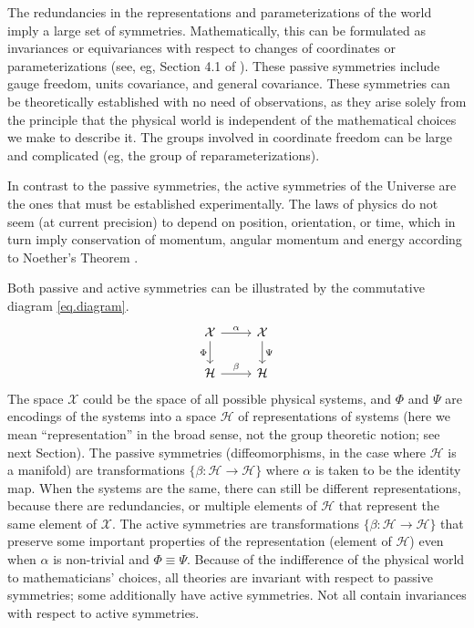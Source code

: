 \documentclass[11pt]{article}
\begin{document}
The redundancies in the representations and parameterizations of the world imply a large set of symmetries.
Mathematically, this can be formulated as invariances or equivariances with respect to changes of coordinates or parameterizations (see, eg, Section 4.1 of \cite{rovelli2000loop}).
These passive symmetries include gauge freedom, units covariance, and general covariance.
These symmetries can be theoretically established with no need of observations, as they arise solely from the principle that the physical world is independent of the mathematical choices we make to describe it.
The groups involved in coordinate freedom can be large and complicated (eg, the group of reparameterizations).

In contrast to the passive symmetries, the active symmetries of the Universe are the ones that must be established experimentally.
The laws of physics do not seem (at current precision) to depend on position, orientation, or time, which in turn imply conservation of momentum, angular momentum and energy according to Noether's Theorem \cite{noether}.

Both passive and active symmetries can be illustrated by the commutative diagram \eqref{eq.diagram}. 
\begin{equation}\label{eq.diagram}
\begin{tikzcd}[]
  {\cal X}\arrow[r,"\alpha"] \arrow[d,"\Phi",swap] & {\cal X}  \arrow[d,"\Psi"]\\
{\cal H} \arrow[r,"\beta"]  & {\cal H} 
\end{tikzcd}
\end{equation}
The space $\mathcal X$ could be the space of all possible physical systems, and $\Phi$ and $\Psi$ are encodings of the systems into a space $\mathcal H$ of representations of systems (here we mean ``representation'' in the broad sense, not the group theoretic notion; see next Section).
The passive symmetries (diffeomorphisms, in the case where $\mathcal H$ is a manifold) are transformations $\{\beta:\mathcal H \to \mathcal H\}$ where $\alpha$ is taken to be the identity map.
When the systems are the same, there can still be different representations, because there are redundancies, or multiple elements of $\mathcal H$ that represent the same element of $\mathcal X$.
The active symmetries are transformations $\{\beta:\mathcal H \to \mathcal H\}$ that preserve some important properties of the representation (element of $\mathcal H$) even when $\alpha$ is non-trivial and $\Phi\equiv \Psi$.
Because of the indifference of the physical world to mathematicians' choices, all theories are invariant with respect to passive symmetries; some additionally have active symmetries.
Not all contain invariances with respect to active symmetries. 
\end{document}
